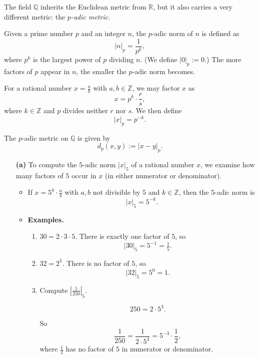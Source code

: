 \begin{problem}

The field $\mathbb{Q}$ inherits the Euclidean metric from $\mathbb{R}$, but it also carries 
a very different metric: the \emph{$p$-adic metric}. 

\medskip

Given a prime number $p$ and an integer $n$, the $p$-adic norm of $n$ is defined as
\[
|n|_p = \frac{1}{p^k},
\]
where $p^k$ is the largest power of $p$ dividing $n$.  
(We define $|0|_p := 0$.)  
The more factors of $p$ appear in $n$, the smaller the $p$-adic norm becomes. 

\medskip

For a rational number $x=\tfrac{a}{b}$ with $a,b\in\mathbb{Z}$, we may factor $x$ as
\[
x = p^k \cdot \frac{r}{s},
\]
where $k \in \mathbb{Z}$ and $p$ divides neither $r$ nor $s$. We then define
\[
|x|_p = p^{-k}.
\]

\medskip

The $p$-adic metric on $\mathbb{Q}$ is given by
\[
d_p(x,y) := |x-y|_p.
\]

\begin{enumerate}

\item[\textbf{(a)}] To compute the $5$-adic norm $|x|_5$ of a rational number $x$, 
we examine how many factors of $5$ occur in $x$ (in either numerator or denominator).

\begin{itemize}
\item If $x=5^k \cdot \tfrac{a}{b}$ with $a,b$ not divisible by $5$ and $k\in \mathbb{Z}$, 
then the $5$-adic norm is
\[
|x|_5 = 5^{-k}.
\]

\item \textbf{Examples.}
\begin{enumerate}
\item $30 = 2 \cdot 3 \cdot 5$. There is exactly one factor of $5$, so
\[
|30|_5 = 5^{-1} = \tfrac{1}{5}.
\]

\item $32 = 2^5$. There is no factor of $5$, so
\[
|32|_5 = 5^{0} = 1.
\]

\item Compute $\left|\tfrac{1}{250}\right|_5$.

\[
250 = 2 \cdot 5^3.
\]

So
\[
\frac{1}{250} = \frac{1}{2 \cdot 5^3} 
= 5^{-3} \cdot \frac{1}{2},
\]
where $\tfrac{1}{2}$ has no factor of $5$ in numerator or denominator.


\end{enumerate}
\end{itemize}
\end{enumerate}
\end{problem}
